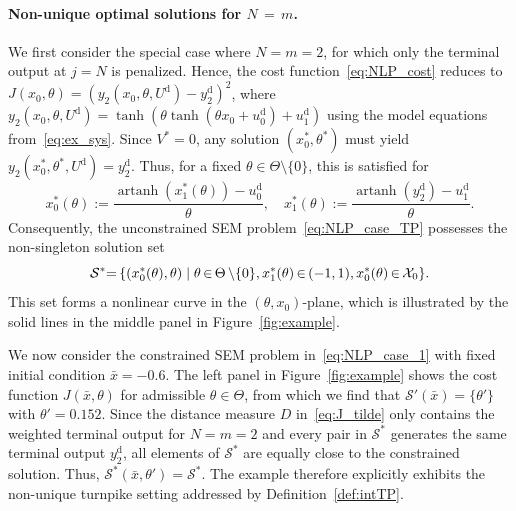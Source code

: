 \documentclass[a4paper,fleqn]{cas-dc}
\DeclareMathOperator{\artanh}{artanh}
\begin{document}
\paragraph{Non-unique optimal solutions for $N{\,=\,}m$.}
We first consider the special case where $N=m=2$, for which only the terminal output at $j=N$ is penalized. Hence, the cost function~\eqref{eq:NLP_cost} reduces to $J(x_0,\theta) =(y_2(x_0,\theta,U^{\mathrm d})-y_2^{\mathrm d})^2$, where $y_2(x_0,\theta,U^{\mathrm d}) = \tanh(\theta \tanh(\theta x_0 + u^\mathrm{d}_0) + u^\mathrm{d}_1)$ using the model equations from~\eqref{eq:ex_sys}.
Since $V^*=0$, any solution $(x_0^*,\theta^*)$ must yield $y_2(x_0^*,\theta^*,U^\mathrm{d}) = y^\mathrm{d}_2$. Thus, for a fixed $\theta\in\Theta\setminus\{0\}$, this is satisfied for
\begin{equation*}
	x_0^*(\theta) := \frac{\artanh(x_1^*(\theta))-u^\mathrm{d}_0}{\theta},
	\quad
	x_1^*(\theta) := \frac{\artanh(y^\mathrm{d}_2)-u^\mathrm{d}_1}{\theta}.
\end{equation*}
Consequently, the unconstrained SEM problem~\eqref{eq:NLP_case_TP} possesses the non-singleton solution set
\begin{equation*}
	\mathcal{S}^*{=}\left\{(x_0^*(\theta),\theta) \mid \theta{\,\in\,}\Theta{\,\setminus}\{0\}, x_1^*(\theta){\,\in\,}(-1,1), x_0^*(\theta){\,\in\,}\mathcal{X}_0\right\}\hspace{-0.4ex}.
\end{equation*}
This set forms a nonlinear curve in the $(\theta,x_0)$-plane, which is illustrated by the solid lines in the middle panel in Figure~\ref{fig:example}.

We now consider the constrained SEM problem in~\eqref{eq:NLP_case_1} with fixed initial condition $\bar{x}=-0.6$. The left panel in Figure~\ref{fig:example} shows the cost function $J(\bar{x},\theta)$ for admissible $\theta\in\Theta$, from which we find that $\mathcal{S}'(\bar{x}) = \{\theta'\}$ with $\theta' =  0.152$.
Since the distance measure $D$ in~\eqref{eq:J_tilde} only contains the weighted terminal output for $N=m=2$ and every pair in $\mathcal{S}^*$ generates the same terminal output $y_2^{\mathrm d}$, all elements of $\mathcal{S}^*$ are equally close to the constrained solution. Thus, $\mathcal{S}^*(\bar{x},\theta')=\mathcal{S}^*$.
The example therefore explicitly exhibits the non-unique turnpike setting addressed by Definition~\ref{def:intTP}.
\end{document}
